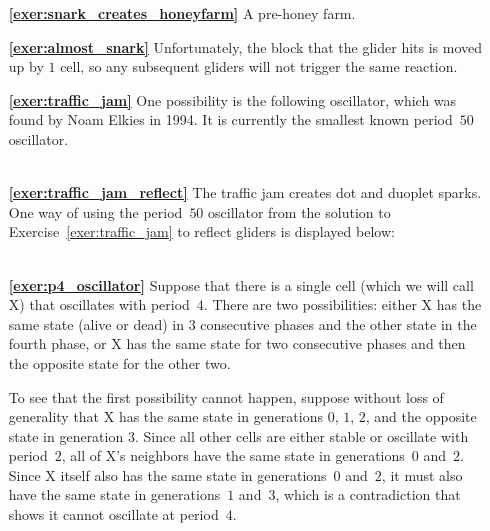 \begin{multicols}{2}
\begin{itemize}[leftmargin=0em]
\begin{enumerate}[leftmargin=1.5em,label=\bf\color{ocre}(\alph*)]
			\item {} \\
		\end{enumerate}
		
		
		\item[\bf\color{ocre}\sffamily\ref{exer:snark_creates_honeyfarm}] A pre-honey farm. \\
		
		
		\item[\bf\color{ocre}\sffamily\ref{exer:almost_snark}] Unfortunately, the block that the glider hits is moved up by $1$ cell, so any subsequent gliders will not trigger the same reaction. \\
		
		
		\item[\bf\color{ocre}\sffamily\ref{exer:traffic_jam}] One possibility is the following oscillator, which was found by Noam Elkies in 1994. It is currently the smallest known period~$50$ oscillator. \\[-0.6em]
		
		 \\
		
		
		\item[\bf\color{ocre}\sffamily\ref{exer:traffic_jam_reflect}] The traffic jam creates dot and duoplet sparks. One way of using the period~$50$ oscillator from the solution to Exercise~\ref{exer:traffic_jam} to reflect gliders is displayed below: \\[-0.6em]
		
		 \\
		
		
		\item[\bf\color{ocre}\sffamily\ref{exer:p4_oscillator}] Suppose that there is a single cell (which we will call X) that oscillates with period~$4$. There are two possibilities: either X has the same state (alive or dead) in $3$ consecutive phases and the other state in the fourth phase, or X has the same state for two consecutive phases and then the opposite state for the other two.
		
		To see that the first possibility cannot happen, suppose without loss of generality that X has the same state in generations $0$, $1$, $2$, and the opposite state in generation $3$. Since all other cells are either stable or oscillate with period~$2$, all of X's neighbors have the same state in generations~$0$ and~$2$. Since X itself also has the same state in generations~$0$ and~$2$, it must also have the same state in generations~$1$ and~$3$, which is a contradiction that shows it cannot oscillate at period~$4$.
		

\end{itemize}
\end{multicols}
